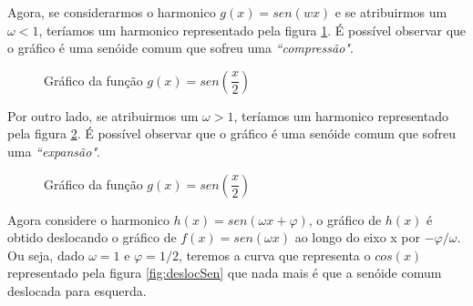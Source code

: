 Agora, se considerarmos o harmonico $g(x) = sen(wx)$ e se atribuirmos um $\omega < 1$,
teríamos um harmonico representado pela figura \ref{fig:compSen}. É possível observar
que o gráfico é uma senóide comum que sofreu uma \textit{``compressão"}.
\begin{figure}[H]
    \caption{Gráfico da função $g(x) = sen\left(\dfrac{x}{2}\right)$}
    \label{fig:compSen}
\end{figure}

Por outro lado, se atribuirmos um $\omega > 1$, teríamos um harmonico 
representado pela figura \ref{fig:expSen}. É possível observar
que o gráfico é uma senóide comum que sofreu uma \textit{``expansão"}.

\begin{figure}[H]
    \caption{Gráfico da função $g(x) = sen\left(\dfrac{x}{2}\right)$}
    \label{fig:expSen}
\end{figure}

Agora considere o harmonico $h(x) = sen(\omega x + \varphi)$, o gráfico 
de $h(x)$ é obtido deslocando o gráfico de $f(x) = sen(\omega x)$ ao
longo do eixo x por $-\varphi/\omega$. Ou seja, dado $\omega = 1$ e 
$\varphi = 1/2$, teremos a curva que representa o $cos(x)$ representado
pela figura \ref{fig:deslocSen} que nada mais é que a senóide  comum 
deslocada para esquerda.\\

